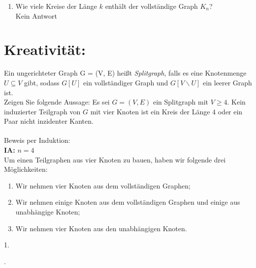 \begin{enumerate}[label=(\alph*)]
        \item Wie viele Kreise der Länge $k$ enthält der vollständige Graph $K_n$? \\
        Kein Antwort
    \end{enumerate}

    \section*{Kreativität:}
        Ein ungerichteter Graph G = (V, E) heißt \textit{Splitgraph}, falls es eine Knotenmenge $U\subseteq V$ gibt,
    	sodass $G[U]$ ein vollständiger Graph und $G[V\backslash U]$ ein leerer Graph ist.\\
    	Zeigen Sie folgende Aussage:
    	Es sei $G = (V, E)$ ein Splitgraph mit $V\geq 4$. Kein induzierter Teilgraph von $G$
    	mit vier Knoten ist ein Kreis der Länge 4 oder ein Paar nicht inzidenter Kanten.\\ \\
    	Beweis per Induktion: \\
    	\textbf{IA:} $n = 4$ \\ 
    	Um einen Teilgraphen aus vier Knoten zu bauen, haben wir folgende drei Möglichkeiten:
    	\begin{enumerate}
    		\item Wir nehmen vier Knoten aus dem vollständigen Graphen;
    		\item Wir nehmen einige Knoten aus dem vollständigen Graphen und einige aus unabhängige Knoten;
    		\item Wir nehmen vier Knoten aus den unabhängigen Knoten.
    	\end{enumerate}
    	1. 
        .
